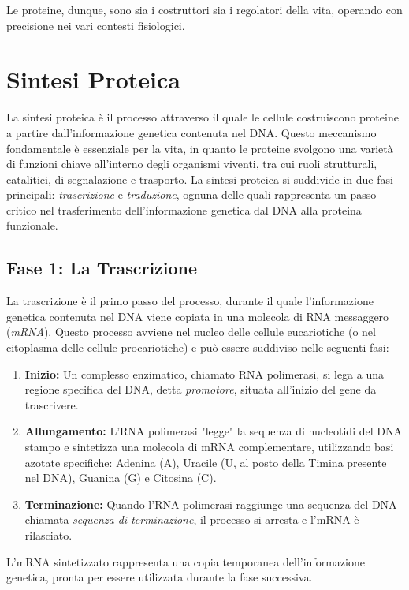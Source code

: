 \documentclass[Lau,binding=0.6cm,oneside,noexaminfo]{sapthesis}
\begin{document}
Le proteine, dunque, sono sia i costruttori sia i regolatori della vita, operando con precisione nei vari contesti fisiologici.
\section{Sintesi Proteica}

La sintesi proteica è il processo attraverso il quale le cellule costruiscono proteine a partire dall'informazione genetica contenuta nel DNA. Questo meccanismo fondamentale è essenziale per la vita, in quanto le proteine svolgono una varietà di funzioni chiave all'interno degli organismi viventi, tra cui ruoli strutturali, catalitici, di segnalazione e trasporto. La sintesi proteica si suddivide in due fasi principali: \textit{trascrizione} e \textit{traduzione}, ognuna delle quali rappresenta un passo critico nel trasferimento dell'informazione genetica dal DNA alla proteina funzionale.

\subsection{Fase 1: La Trascrizione}

La trascrizione è il primo passo del processo, durante il quale l'informazione genetica contenuta nel DNA viene copiata in una molecola di RNA messaggero (\textit{mRNA}). Questo processo avviene nel nucleo delle cellule eucariotiche (o nel citoplasma delle cellule procariotiche) e può essere suddiviso nelle seguenti fasi:
\begin{enumerate}
    \item \textbf{Inizio:} Un complesso enzimatico, chiamato RNA polimerasi, si lega a una regione specifica del DNA, detta \textit{promotore}, situata all'inizio del gene da trascrivere.
    \item \textbf{Allungamento:} L'RNA polimerasi "legge" la sequenza di nucleotidi del DNA stampo e sintetizza una molecola di mRNA complementare, utilizzando basi azotate specifiche: Adenina (A), Uracile (U, al posto della Timina presente nel DNA), Guanina (G) e Citosina (C).
    \item \textbf{Terminazione:} Quando l'RNA polimerasi raggiunge una sequenza del DNA chiamata \textit{sequenza di terminazione}, il processo si arresta e l'mRNA è rilasciato.
\end{enumerate}

L'mRNA sintetizzato rappresenta una copia temporanea dell'informazione genetica, pronta per essere utilizzata durante la fase successiva.
\end{document}
